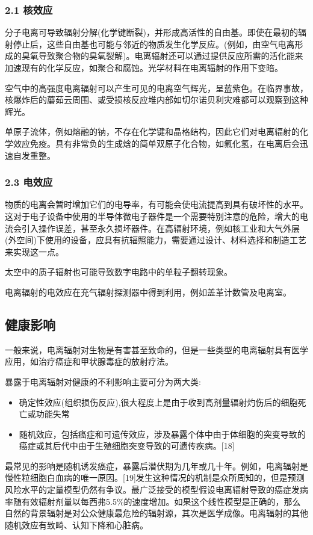 \subsubsection{2.1 核效应}
分子电离可导致辐射分解(化学键断裂)，并形成高活性的自由基。即使在最初的辐射停止后，这些自由基也可能与邻近的物质发生化学反应。(例如，由空气电离形成的臭氧导致聚合物的臭氧裂解)。电离辐射还可以通过提供反应所需的活化能来加速现有的化学反应，如聚合和腐蚀。光学材料在电离辐射的作用下变暗。

空气中的高强度电离辐射可以产生可见的电离空气辉光，呈蓝紫色。在临界事故，核爆炸后的蘑茹云周围、或受损核反应堆内部如切尔诺贝利灾难都可以观察到这种辉光。

单原子流体，例如熔融的钠，不存在化学键和晶格结构，因此它们对电离辐射的化学效应免疫。具有非常负的生成焓的简单双原子化合物，如氟化氢，在电离后会迅速自发重整。

\subsubsection{2.3 电效应}
物质的电离会暂时增加它们的电导率，有可能会使电流提高到具有破坏性的水平。这对于电子设备中使用的半导体微电子器件是一个需要特别注意的危险，增大的电流会引入操作误差，甚至永久损坏器件。在高辐射环境，例如核工业和大气外层(外空间)下使用的设备，应具有抗辐照能力，需要通过设计、材料选择和制造工艺来实现这一点。

太空中的质子辐射也可能导致数字电路中的单粒子翻转现象。

电离辐射的电效应在充气辐射探测器中得到利用，例如盖革计数管及电离室。

\subsection{健康影响}
一般来说，电离辐射对生物是有害甚至致命的，但是一些类型的电离辐射具有医学应用，如治疗癌症和甲状腺毒症的放射疗法。

暴露于电离辐射对健康的不利影响主要可分为两大类:
\begin{itemize}
\item 确定性效应(组织损伤反应),很大程度上是由于收到高剂量辐射灼伤后的细胞死亡或功能失常
\item 随机效应，包括癌症和可遗传效应，涉及暴露个体中由于体细胞的突变导致的癌症或其后代中由于生殖细胞突变导致的可遗传疾病。[18]
\end{itemize}
最常见的影响是随机诱发癌症，暴露后潜伏期为几年或几十年。例如，电离辐射是慢性粒细胞白血病的唯一原因。[19]发生这种情况的机制是众所周知的，但是预测风险水平的定量模型仍然有争议。最广泛接受的模型假设电离辐射导致的癌症发病率随有效辐射剂量以每西弗5.5\%的速度增加。如果这个线性模型是正确的，那么自然的背景辐射是对公众健康最危险的辐射源，其次是医学成像。电离辐射的其他随机效应有致畸、认知下降和心脏病。

